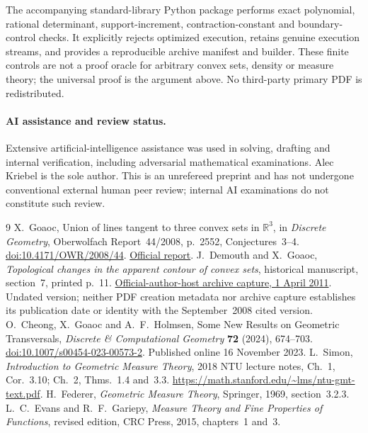 \documentclass[11pt]{article}
\newcommand{\R}{\mathbb R}
\theoremstyle{remark}
\begin{document}
The accompanying standard-library Python package performs exact polynomial, rational determinant, support-increment, contraction-constant and boundary-control checks. It explicitly rejects optimized execution, retains genuine execution streams, and provides a reproducible archive manifest and builder. These finite controls are not a proof oracle for arbitrary convex sets, density or measure theory; the universal proof is the argument above. No third-party primary PDF is redistributed.

\paragraph{AI assistance and review status.}
Extensive artificial-intelligence assistance was used in solving, drafting and internal verification, including adversarial mathematical examinations. Alec Kriebel is the sole author. This is an unrefereed preprint and has not undergone conventional external human peer review; internal AI examinations do not constitute such review.

\begin{thebibliography}{9}
 X.~Goaoc, Union of lines tangent to three convex sets in $\R^3$, in \emph{Discrete Geometry}, Oberwolfach Report~44/2008, p.~2552, Conjectures~3--4. \href{https://doi.org/10.4171/OWR/2008/44}{doi:10.4171/OWR/2008/44}. \href{https://ems.press/content/serial-article-files/46191}{Official report}.
 J.~Demouth and X.~Goaoc, \emph{Topological changes in the apparent contour of convex sets}, historical manuscript, section~7, printed p.~11. \href{https://web.archive.org/web/20110401122240id_/http://www.loria.fr/~goaoc/papers/TopVE.pdf}{Official-author-host archive capture, 1 April 2011}. Undated version; neither PDF creation metadata nor archive capture establishes its publication date or identity with the September~2008 cited version.
 O.~Cheong, X.~Goaoc and A.~F.~Holmsen, Some New Results on Geometric Transversals, \emph{Discrete \& Computational Geometry} \textbf{72} (2024), 674--703. \href{https://doi.org/10.1007/s00454-023-00573-2}{doi:10.1007/s00454-023-00573-2}. Published online 16 November 2023.
 L.~Simon, \emph{Introduction to Geometric Measure Theory}, 2018 NTU lecture notes, Ch.~1, Cor.~3.10; Ch.~2, Thms.~1.4 and~3.3. \url{https://math.stanford.edu/~lms/ntu-gmt-text.pdf}.
 H.~Federer, \emph{Geometric Measure Theory}, Springer, 1969, section~3.2.3.
 L.~C.~Evans and R.~F.~Gariepy, \emph{Measure Theory and Fine Properties of Functions}, revised edition, CRC Press, 2015, chapters~1 and~3.
\end{thebibliography}
\end{document}
